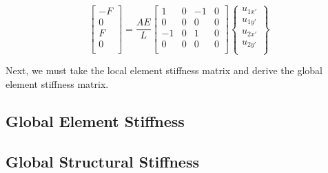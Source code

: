 \begin{equation}
	\begin{bmatrix}
	-F\\ 0\\ F\\ 0\\
	\end{bmatrix}
	=
	\frac{AE}{L}
	\begin{bmatrix}
	1 & 0 & -1 & 0\\
	0 & 0 & 0 & 0\\
	-1 & 0 & 1 & 0\\
	0 & 0 & 0 & 0\\
	\end{bmatrix}
	\begin{Bmatrix}
	u_{1x'}\\ u_{1y'}\\ u_{2x'}\\ u_{2y'}\\
	\end{Bmatrix}
\end{equation}

Next, we must take the local element stiffness matrix and derive the global element stiffness matrix.

\subsection{Global Element Stiffness}


\subsection{Global Structural Stiffness}



